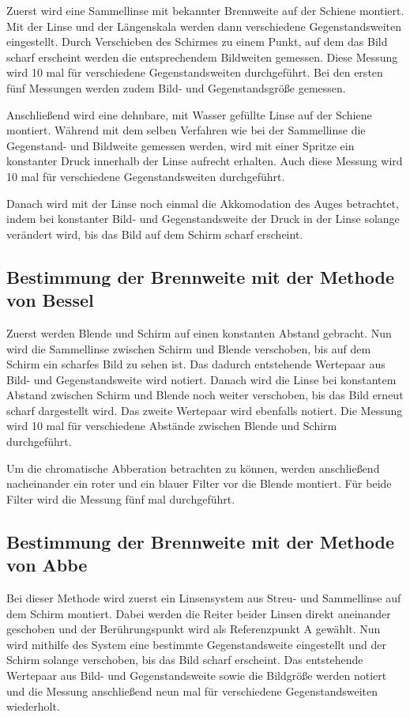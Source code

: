 Zuerst wird eine Sammellinse mit bekannter Brennweite auf der Schiene montiert.
Mit der Linse und der
Längenskala werden dann verschiedene Gegenstandsweiten eingestellt. Durch
Verschieben des Schirmes zu einem Punkt, auf dem das Bild scharf erscheint
werden die entsprechendem Bildweiten gemessen. Diese Messung wird 10 mal für
verschiedene Gegenstandsweiten durchgeführt.
Bei den ersten fünf Messungen werden zudem Bild- und Gegenstandsgröße gemessen.

Anschließend wird eine dehnbare, mit Wasser gefüllte Linse auf der Schiene montiert.
Während mit dem selben Verfahren wie bei der Sammellinse die Gegenstand- und Bildweite
gemessen werden, wird mit einer Spritze ein konstanter Druck innerhalb der
Linse aufrecht erhalten. Auch diese Messung wird 10 mal für verschiedene
Gegenstandsweiten durchgeführt.

Danach wird mit der Linse noch einmal die Akkomodation des Auges betrachtet, indem
bei konstanter Bild- und Gegenstandsweite der Druck in der Linse solange verändert
wird, bis das Bild auf dem Schirm scharf erscheint.

\subsection{Bestimmung der Brennweite mit der Methode von Bessel}

Zuerst werden Blende und Schirm auf einen konstanten Abstand gebracht. Nun
wird die Sammellinse zwischen Schirm und Blende verschoben, bis auf dem Schirm
ein scharfes Bild zu sehen ist. Das dadurch entstehende Wertepaar aus Bild-
und Gegenstandsweite wird notiert. Danach wird die Linse bei konstantem Abstand
zwischen Schirm und Blende noch weiter verschoben, bis das Bild erneut scharf
dargestellt wird. Das zweite Wertepaar wird ebenfalls notiert. Die Messung
wird 10 mal für verschiedene Abstände zwischen Blende und Schirm durchgeführt.

Um die chromatische Abberation betrachten zu können, werden
anschließend nacheinander ein roter und ein blauer Filter vor die
Blende montiert. Für beide Filter wird die Messung fünf mal durchgeführt.

\subsection{Bestimmung der Brennweite mit der Methode von Abbe}

Bei dieser Methode wird zuerst ein Linsensystem aus Streu- und Sammellinse auf
dem Schirm montiert. Dabei werden die Reiter beider Linsen direkt aneinander
geschoben und der Berührungspunkt wird als Referenzpunkt A gewählt. Nun wird
mithilfe des System eine bestimmte Gegenstandsweite eingestellt und der Schirm
solange verschoben, bis das Bild scharf erscheint. Das entstehende Wertepaar aus
Bild- und Gegenstandsweite sowie die Bildgröße werden notiert und die Messung
anschließend neun mal für verschiedene Gegenstandsweiten wiederholt.

\printbibliography


